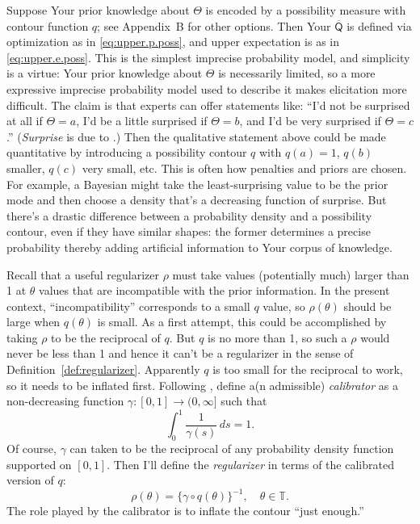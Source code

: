 \documentclass[a4paper, 12pt]{article}
\theoremstyle{plain}
\theoremstyle{definition}
\theoremstyle{remark}
\newcommand{\TT}{\mathbb{T}}
\newcommand{\uprior}{\overline{\mathsf{Q}}}
\begin{document}
Suppose Your prior knowledge about $\Theta$ is encoded by a possibility measure with contour function $q$; see Appendix~B for other options.  Then Your $\uprior$ is defined via optimization as in \eqref{eq:upper.p.poss}, and upper expectation is as in \eqref{eq:upper.e.poss}.  This is the simplest imprecise probability model, and simplicity is a virtue: Your prior knowledge about $\Theta$ is necessarily limited, so a more expressive imprecise probability model used to describe it makes elicitation more difficult.  The claim is that experts can offer statements like: ``I'd not be surprised at all if $\Theta=a$, I'd be a little surprised if $\Theta=b$, and I'd be very surprised if $\Theta=c$.'' ({\em Surprise} is due to \citealt{shackle1961}.)  Then the qualitative statement above could be made quantitative by introducing a possibility contour $q$ with $q(a)=1$, $q(b)$ smaller, $q(c)$ very small, etc.  This is often how penalties and priors are chosen.  For example, a Bayesian might take the least-surprising value to be the prior mode and then choose a density that's a decreasing function of surprise.  But there's a drastic difference between a probability density and a possibility contour, even if they have similar shapes: the former determines a precise probability thereby adding artificial information to Your corpus of knowledge.  

Recall that a useful regularizer $\rho$ must take values (potentially much) larger than 1 at $\theta$ values that are incompatible with the prior information.  In the present context, ``incompatibility'' corresponds to a small $q$ value, so $\rho(\theta)$ should be large when $q(\theta)$ is small.  As a first attempt, this could be accomplished by taking $\rho$ to be the reciprocal of $q$.  But $q$ is no more than 1, so such a $\rho$ would never be less than 1 and hence it can't be a regularizer in the sense of Definition~\ref{def:regularizer}.  Apparently $q$ is too small for the reciprocal to work, so it needs to be inflated first.  Following \citet[][Sec.~6]{shafer.vovk.martingale}, define a(n admissible) {\em calibrator}
as a non-decreasing function $\gamma: [0,1] \to (0, \infty]$ such that   
\begin{equation}
\label{eq:calibrate}
\int_0^1 \frac{1}{\gamma(s)} \, ds = 1. 
\end{equation} 
Of course, $\gamma$ can taken to be the reciprocal of any probability density function supported on $[0,1]$.  Then 
I'll define the {\em regularizer} in terms of the calibrated version of $q$: 
\begin{equation}
\label{eq:regularizer}
\rho(\theta) = \{ \gamma \circ q(\theta) \}^{-1}, \quad \theta \in \TT. 
\end{equation}
The role played by the calibrator is to inflate the contour ``just enough.'' 
\end{document}
